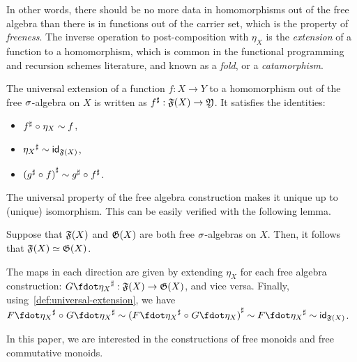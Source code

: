 %
In other words, there should be no more data in homomorphisms out of the free algebra than there is in functions out of
the carrier set, which is the property of \emph{freeness}.
%
The inverse operation to post-composition with $\eta_X$ is the \emph{extension} of a function to a homomorphism,
which is common in the functional programming and recursion schemes literature, and known as a \emph{fold},
or a \emph{catamorphism}.
%
\begin{definition}
    \label{def:universal-extension}
    The universal extension of a function $f : X \to Y$ to a homomorphism out of the free $\sigma$-algebra on $X$ is written
    as ${f}^{\sharp} : \mathfrak{F}(X) \to \mathfrak{Y}$.
    It satisfies the identities:
    \begin{itemize}
        \item ${f}^{\sharp} \mathrel{\circ} \eta_X \mathrel{\sim} f$,
        \item ${\eta_{X}}^{\sharp} \mathrel{\sim} \operatorname{\mathsf{id}}_{\mathfrak{F}(X)}$,
        \item ${({g}^{\sharp} \mathrel{\circ} f)}^{\sharp} \mathrel{\sim} {g}^{\sharp} \mathrel{\circ} {f}^{\sharp}$.
    \end{itemize}
\end{definition}

The universal property of the free algebra construction makes it unique up to (unique) isomorphism.
%
This can be easily verified with the following lemma.
\begin{lemma}
    \label{lem:free-algebras-unique}
    Suppose that $\mathfrak{F}(X)$ and $\mathfrak{G}(X)$ are both free $\sigma$-algebras on $X$.
    Then, it follows that $\mathfrak{F}(X) \mathrel{\simeq} \mathfrak{G}(X)$.~
\end{lemma}
\begin{proofsketch}
    The maps in each direction are given by extending $\eta_X$ for each free algebra construction:
    $\ext{G\fdot\eta_{X}} : \str{F}(X) \to \str{G}(X)$, and vice versa.
    Finally, using~\cref{def:universal-extension}, we have
    \(
    \ext{F\fdot\eta_{X}} \comp \ext{G\fdot\eta_{X}} \htpy
    \ext{(\ext{F\fdot\eta_{X}} \comp G\fdot\eta_{X})} \htpy
    \ext{F\fdot\eta_{X}} \htpy
    \idfunc_{\str{F}(X)}
    \).
\end{proofsketch}


In this paper, we are interested in the constructions of free monoids and free commutative monoids.